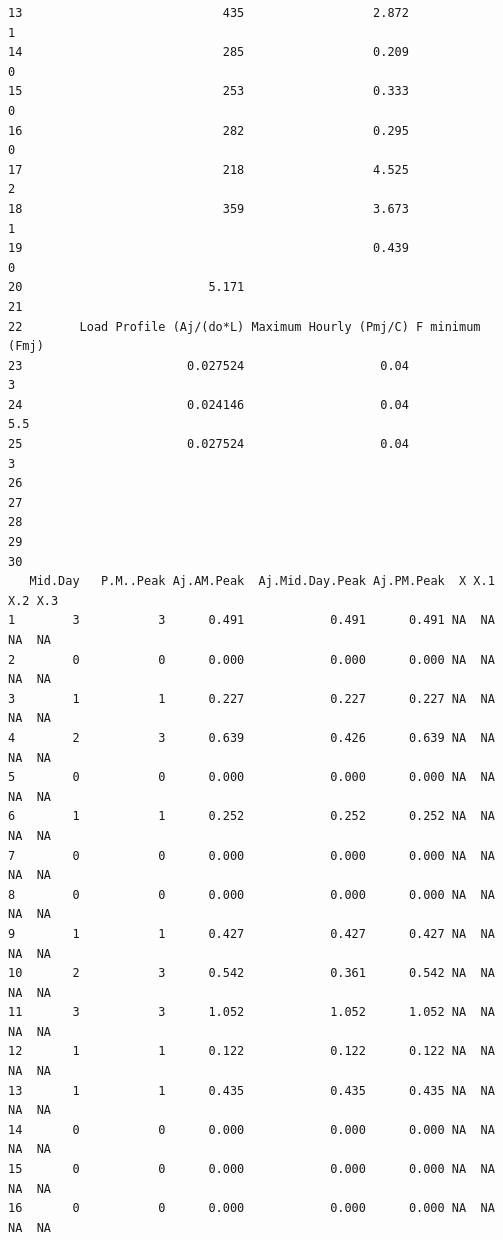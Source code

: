 \documentclass[
11pt, %
oneside, %
english, %
singlespacing, %
]{macthesis} %
\begin{document}
\begin{verbatim}
13                            435                  2.872               1
14                            285                  0.209               0
15                            253                  0.333               0
16                            282                  0.295               0
17                            218                  4.525               2
18                            359                  3.673               1
19                                                 0.439               0
20                          5.171                                       
21                                                                      
22        Load Profile (Aj/(do*L) Maximum Hourly (Pmj/C) F minimum (Fmj)
23                       0.027524                   0.04               3
24                       0.024146                   0.04             5.5
25                       0.027524                   0.04               3
26                                                                      
27                                                                      
28                                                                      
29                                                                      
30                                                                      
   Mid.Day   P.M..Peak Aj.AM.Peak  Aj.Mid.Day.Peak Aj.PM.Peak  X X.1 X.2 X.3
1        3           3      0.491            0.491      0.491 NA  NA  NA  NA
2        0           0      0.000            0.000      0.000 NA  NA  NA  NA
3        1           1      0.227            0.227      0.227 NA  NA  NA  NA
4        2           3      0.639            0.426      0.639 NA  NA  NA  NA
5        0           0      0.000            0.000      0.000 NA  NA  NA  NA
6        1           1      0.252            0.252      0.252 NA  NA  NA  NA
7        0           0      0.000            0.000      0.000 NA  NA  NA  NA
8        0           0      0.000            0.000      0.000 NA  NA  NA  NA
9        1           1      0.427            0.427      0.427 NA  NA  NA  NA
10       2           3      0.542            0.361      0.542 NA  NA  NA  NA
11       3           3      1.052            1.052      1.052 NA  NA  NA  NA
12       1           1      0.122            0.122      0.122 NA  NA  NA  NA
13       1           1      0.435            0.435      0.435 NA  NA  NA  NA
14       0           0      0.000            0.000      0.000 NA  NA  NA  NA
15       0           0      0.000            0.000      0.000 NA  NA  NA  NA
16       0           0      0.000            0.000      0.000 NA  NA  NA  NA

\end{verbatim}
\end{document}
